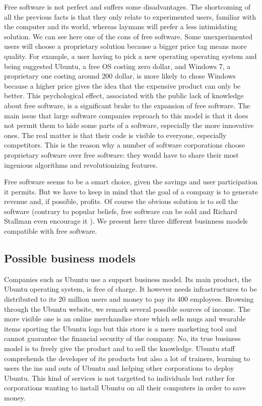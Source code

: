 \documentclass[12pt]{article}
\begin{document}
Free software is not perfect and suffers some disadvantages. The
shortcoming of all the previous facts is that they only relate to
experimented users, familiar with the computer and its world, whereas
laymans will prefer a less intimidating solution. We can see here one
of the cons of free software. Some unexperimented users will choose a
proprietary solution because a bigger price tag means more quality.
For example, a user having to pick a new operating operating system
and being suggested Ubuntu, a free OS costing zero dollar, and Windows
7, a proprietary one costing around 200 dollar, is more likely to
chose Windows because a higher price gives the idea that the expensive
product can only be better.  This psychological effect, associated
with the public lack of knowledge about free software, is a
significant brake to the expansion of free software. The main issue
that large software companies reproach to this model is that it does
not permit them to hide some parts of a software, especially the more
innovative ones. The real matter is that their code is visible to
everyone, especially competitors. This is the reason why a number of
software corporations choose proprietary software over free software:
they would have to share their most ingenious algorithms and
revolutionizing features.

Free software seems to be a smart choice, given the savings and user
participation it permits. But we have to keep in mind that the goal of
a company is to generate revenue and, if possible, profits. Of course
the obvious solution is to sell the software (contrary to popular
beliefs, free software can be sold and Richard Stallman even encourage
it \cite{sell}). We present here three different businness models
compatible with free software.

\subsection{Possible business models}

Companies such as Ubuntu use a support business model. Its main
product, the Ubuntu operating system, is free of charge. It however
needs infrastructures to be distributed to its 20 million users and
money to pay its 400 employees. Browsing through the Ubuntu website,
we remark several possible sources of income. The more visible one is
an online merchandise store which sells mugs and wearable items
sporting the Ubuntu logo but this store is a mere marketing tool and
cannot guarantee the financial security of the company.  No, its true
business model is to freely give the product and to sell the
knowledge. Ubuntu staff comprehends the developer of its products but
also a lot of trainers, learning to users the ins and outs of Ubuntu
and helping other corporations to deploy Ubuntu. This kind of services
is not targetted to individuals but rather for corporations wanting to
install Ubuntu on all their computers in order to save money.
\end{document}
